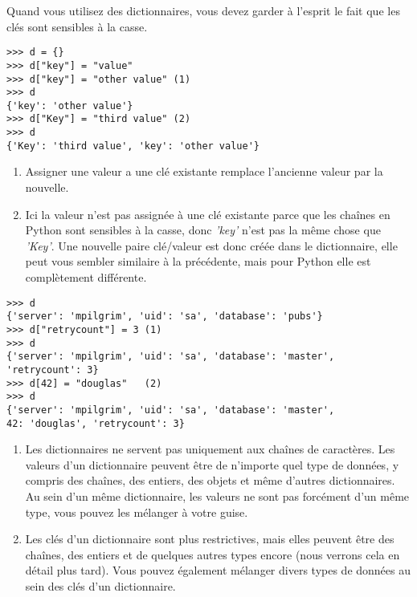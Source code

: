 
Quand vous utilisez des dictionnaires, vous devez garder à l'esprit le fait que les clés sont sensibles à la casse.

\begin{example}
\begin{lstlisting}
>>> d = {}
>>> d["key"] = "value"
>>> d["key"] = "other value" (1)
>>> d
{'key': 'other value'}
>>> d["Key"] = "third value" (2)
>>> d
{'Key': 'third value', 'key': 'other value'}
\end{lstlisting}
\end{example}

\begin{enumerate}
\item{Assigner une valeur a une clé existante remplace l'ancienne valeur par la nouvelle.}
\item{Ici la valeur n'est pas assignée à une clé existante parce que les chaînes en Python sont sensibles à la casse, donc \emph{'key'} n'est pas la même chose que \emph{'Key'}. Une nouvelle paire clé/valeur est donc créée dans le dictionnaire, elle peut vous sembler similaire à la précédente, mais pour Python elle est complètement différente.}
\end{enumerate}

\begin{example}
\begin{lstlisting}
>>> d
{'server': 'mpilgrim', 'uid': 'sa', 'database': 'pubs'}
>>> d["retrycount"] = 3 (1)
>>> d
{'server': 'mpilgrim', 'uid': 'sa', 'database': 'master', 'retrycount': 3}
>>> d[42] = "douglas"   (2)
>>> d
{'server': 'mpilgrim', 'uid': 'sa', 'database': 'master',
42: 'douglas', 'retrycount': 3}
\end{lstlisting}
\end{example}

\begin{enumerate}
\item{Les dictionnaires ne servent pas uniquement aux chaînes de caractères. Les valeurs d'un dictionnaire peuvent être de n'importe quel type de données, y compris des chaînes, des entiers, des objets et même d'autres dictionnaires. Au sein d'un même dictionnaire, les valeurs ne sont pas forcément d'un même type, vous pouvez les mélanger à votre guise.}
\item{Les clés d'un dictionnaire sont plus restrictives, mais elles peuvent être des chaînes, des entiers et de quelques autres types encore (nous verrons cela en détail plus tard). Vous pouvez également mélanger divers types de données au sein des clés d'un dictionnaire.}
\end{enumerate}

